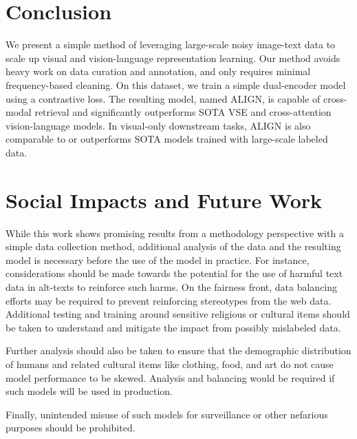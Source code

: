\documentclass{article}
\begin{document}
\section{Conclusion}

We present a simple method of leveraging large-scale noisy image-text data to scale up visual and vision-language representation learning. Our method avoids heavy work on data curation and annotation, and only requires minimal frequency-based cleaning. On this dataset, we train a simple dual-encoder model using a contrastive loss. The resulting model, named ALIGN, is capable of cross-modal retrieval and significantly outperforms SOTA VSE and cross-attention vision-language models. In visual-only downstream tasks, ALIGN is also comparable to or outperforms SOTA models trained with large-scale labeled data.

\section{Social Impacts and Future Work}
While this work shows promising results from a methodology perspective with a simple data collection method, additional analysis of the data and the resulting model is necessary before the use of the model in practice. For instance, considerations should be made towards the potential for the use of harmful text data in alt-texts to reinforce such harms. On the fairness front, data balancing efforts may be required to prevent reinforcing stereotypes from the web data. Additional testing and training around sensitive religious or cultural items should be taken to understand and mitigate the impact from possibly mislabeled data.

Further analysis should also be taken to ensure that the demographic distribution of humans and related cultural items like clothing, food, and art do not cause model performance to be skewed. Analysis and balancing would be required if such models will be used in production. 

Finally, unintended misuse of such models for surveillance or other nefarious purposes should be prohibited.
\end{document}
